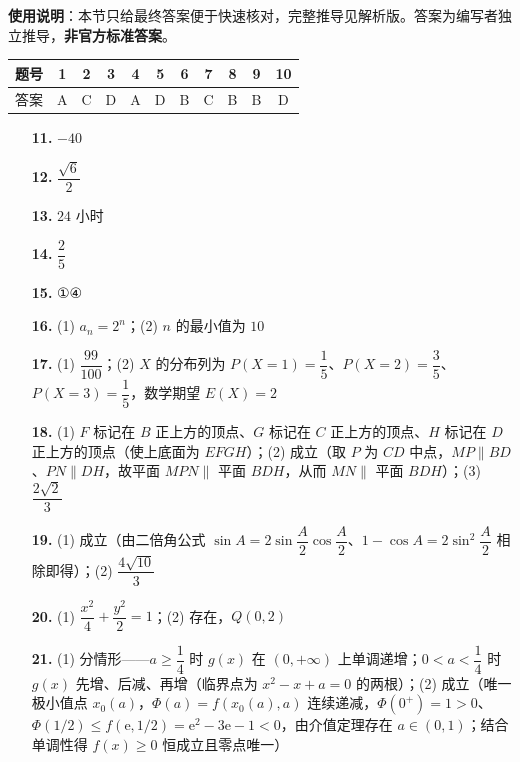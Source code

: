 
\begin{gknotice}
\textbf{使用说明}：本节只给最终答案便于快速核对，完整推导见解析版。答案为编写者独立推导，\textbf{非官方标准答案}。
\end{gknotice}

\begin{center}\begin{tabular}{ccccccccccc}
\toprule
题号 & 1 & 2 & 3 & 4 & 5 & 6 & 7 & 8 & 9 & 10 \\
\midrule
答案 & A & C & D & A & D & B & C & B & B & D \\
\bottomrule
\end{tabular}\end{center}

\begin{itemize}[leftmargin=2.6em]
  \item[\textbf{11.}] \(-40\)
  \item[\textbf{12.}] \(\dfrac{\sqrt{6}}{2}\)
  \item[\textbf{13.}] \(24\) 小时
  \item[\textbf{14.}] \(\dfrac{2}{5}\)
  \item[\textbf{15.}] ①④
\end{itemize}

\begin{itemize}[leftmargin=2.6em]
  \item[\textbf{16.}] (1) \(a_n=2^n\)；(2) \(n\) 的最小值为 \(10\)
  \item[\textbf{17.}] (1) \(\dfrac{99}{100}\)；(2) \(X\) 的分布列为 \(P(X=1)=\dfrac{1}{5}\)、\(P(X=2)=\dfrac{3}{5}\)、\(P(X=3)=\dfrac{1}{5}\)，数学期望 \(E(X)=2\)
  \item[\textbf{18.}] (1) \(F\) 标记在 \(B\) 正上方的顶点、\(G\) 标记在 \(C\) 正上方的顶点、\(H\) 标记在 \(D\) 正上方的顶点（使上底面为 \(EFGH\)）；(2) 成立（取 \(P\) 为 \(CD\) 中点，\(MP\parallel BD\)、\(PN\parallel DH\)，故平面 \(MPN\parallel\) 平面 \(BDH\)，从而 \(MN\parallel\) 平面 \(BDH\)）；(3) \(\dfrac{2\sqrt{2}}{3}\)
  \item[\textbf{19.}] (1) 成立（由二倍角公式 \(\sin A=2\sin\dfrac{A}{2}\cos\dfrac{A}{2}\)、\(1-\cos A=2\sin^{2}\dfrac{A}{2}\) 相除即得）；(2) \(\dfrac{4\sqrt{10}}{3}\)
  \item[\textbf{20.}] (1) \(\dfrac{x^2}{4}+\dfrac{y^2}{2}=1\)；(2) 存在，\(Q(0,2)\)
  \item[\textbf{21.}] (1) 分情形——\(a\geqslant\dfrac{1}{4}\) 时 \(g(x)\) 在 \((0,+\infty)\) 上单调递增；\(0<a<\dfrac{1}{4}\) 时 \(g(x)\) 先增、后减、再增（临界点为 \(x^2-x+a=0\) 的两根）；(2) 成立（唯一极小值点 \(x_0(a)\)，\(\Phi(a)=f(x_0(a),a)\) 连续递减，\(\Phi(0^{+})=1>0\)、\(\Phi(1/2)\leqslant f(\mathrm{e},1/2)=\mathrm{e}^2-3\mathrm{e}-1<0\)，由介值定理存在 \(a\in(0,1)\)；结合单调性得 \(f(x)\geqslant 0\) 恒成立且零点唯一）
\end{itemize}
